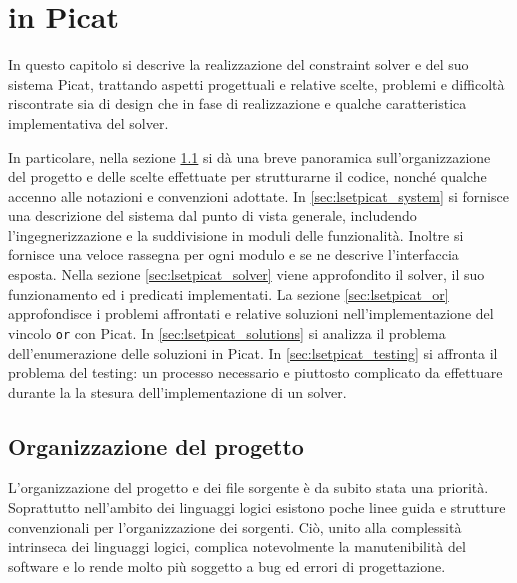 \documentclass[12pt,a4paper,openright]{book} %
\begin{document}
\chapter{\lset{} in Picat}
\label{ch:lsetpicat}


In questo capitolo si descrive la realizzazione del constraint solver
e del suo sistema Picat, trattando aspetti progettuali e relative
scelte, problemi e difficoltà riscontrate sia di design che in fase di
realizzazione e qualche caratteristica implementativa del solver.

In particolare, nella sezione \ref{sec:lsetpicat_project} si dà una
breve panoramica sull'organizzazione del progetto e delle scelte
effettuate per strutturarne il codice, nonché qualche accenno alle
notazioni e convenzioni adottate. In \ref{sec:lsetpicat_system} si
fornisce una descrizione del sistema dal punto di vista generale,
includendo l'ingegnerizzazione e la suddivisione in moduli delle
funzionalità. Inoltre si fornisce una veloce rassegna per ogni modulo
e se ne descrive l'interfaccia esposta. Nella sezione
\ref{sec:lsetpicat_solver} viene approfondito il solver, il suo
funzionamento ed i predicati implementati. La sezione
\ref{sec:lsetpicat_or} approfondisce i problemi affrontati e relative
soluzioni nell'implementazione del vincolo \texttt{or} con Picat. In
\ref{sec:lsetpicat_solutions} si analizza il problema
dell'enumerazione delle soluzioni in Picat. In
\ref{sec:lsetpicat_testing} si affronta il problema del testing: un
processo necessario e piuttosto complicato da effettuare durante la la
stesura dell’implementazione di un solver.

\section{Organizzazione del progetto}
\label{sec:lsetpicat_project}

L'organizzazione del progetto e dei file sorgente è da subito stata
una priorità. Soprattutto nell'ambito dei linguaggi logici esistono
poche linee guida e strutture convenzionali per l'organizzazione dei
sorgenti. Ciò, unito alla complessità intrinseca dei linguaggi logici,
complica notevolmente la manutenibilità del software e lo rende molto
più soggetto a bug ed errori di progettazione.
\end{document}

